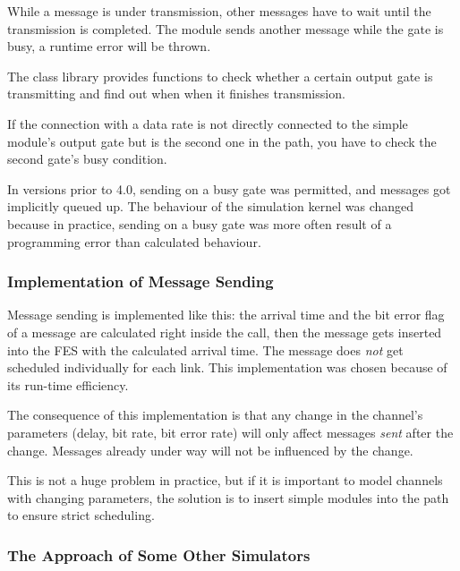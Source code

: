 While a message is under transmission, other messages have to wait
until the transmission is completed. The module sends another message while the
gate is busy, a runtime error will be thrown.

The {\opp} class library provides functions to check
whether a certain output gate is transmitting and find out when when
it finishes transmission.

If the connection with a data rate is not directly connected
to the simple module's output gate but is the second
one in the path, you have to check the second gate's busy
condition.

\begin{note}
   In {\opp} versions prior to 4.0, sending on a busy gate was permitted, and
   messages got implicitly queued up. The behaviour of the simulation kernel
   was changed because in practice, sending on a busy gate was more often result
   of a programming error than calculated behaviour.
\end{note}


\subsubsection{Implementation of Message Sending}

Message sending is implemented like this: the arrival time
and the bit error flag of a message are calculated right inside
the  call, then the message gets inserted into the FES
with the calculated arrival time. The message does \textit{not} get scheduled
individually for each link. This implementation was chosen because of its
run-time efficiency.

\begin{note}
   The consequence of this implementation is that any change in the
   channel's parameters (delay, bit rate, bit error rate) will only affect
   messages \textit{sent} after the change. Messages already under way will not
   be influenced by the change.

   This is not a huge problem in practice, but if it is important to model
   channels with changing parameters, the solution is to insert simple modules
   into the path to ensure strict scheduling.
\end{note}


\subsubsection{The Approach of Some Other Simulators}

